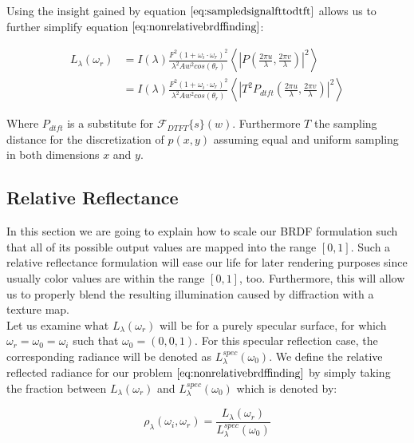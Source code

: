 Using the insight gained by equation $\ref{eq:sampledsignalfttodtft}$ allows us to further simplify equation $\ref{eq:nonrelativebrdffinding}$:

\begin{align}
L_{\lambda}(\omega_r) 
& = I(\lambda) \frac{F^2 (1 + \omega_i \cdot \omega_r)^2}{\lambda^2 A w^2 cos(\theta_r)} \left \langle \left|P \left( \frac{2\pi u}{\lambda}, \frac{2\pi v}{\lambda}\right) \right|^2 \right \rangle \nonumber \\
& = I(\lambda) \frac{F^2 (1 + \omega_i \cdot \omega_r)^2}{\lambda^2 A w^2 cos(\theta_r)} \left \langle \left|T^2 P_{dtft}\left( \frac{2\pi u}{\lambda}, \frac{2\pi v}{\lambda}\right) \right|^2 \right \rangle
\label{eq:nonrelativebrdffindingreproddtft}
\end{align}

Where $P_{dtft}$ is a substitute for $\mathcal{F}_{DTFT}\{s\}(w)$. Furthermore $T$ the sampling distance for the discretization of $p(x,y)$ assuming equal and uniform sampling in both dimensions $x$ and $y$.

\subsection{Relative Reflectance}
\label{sec:relrefl}
In this section we are going to explain how to scale our BRDF formulation such that all of its possible output values are mapped into the range $\left[0,1\right]$. Such a relative reflectance formulation will ease our life for later rendering purposes since usually color values are within the range $\left[0,1\right]$, too. Furthermore, this will allow us to properly blend the resulting illumination caused by diffraction with a texture map. \\

Let us examine what $L_\lambda(\omega_r)$ will be for a purely specular surface, for which $\omega_r = \omega_0 = \omega_i$ such that $\omega_0 = (0,0,1)$. For this specular reflection case, the corresponding radiance will be denoted as $L_\lambda^{spec}(\omega_0)$. We define the relative reflected radiance for our problem $\ref{eq:nonrelativebrdffinding}$ by simply taking the fraction between $L_\lambda(\omega_r)$ and $L_\lambda^{spec}(\omega_0)$ which is denoted by: 

\begin{equation}
  \rho_\lambda(\omega_i,\omega_r) = \frac{L_\lambda(\omega_r)}{L_\lambda^{spec}(\omega_0)}
  \label{eq:rohrel}
\end{equation}

